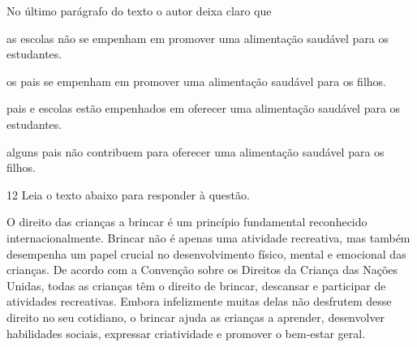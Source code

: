 No último parágrafo do texto o autor deixa claro que

\begin{escolha}
    
    \item as escolas não se empenham em promover uma alimentação saudável para os estudantes.
    
    \item os pais se empenham em promover uma alimentação saudável para os filhos.
    
    \item pais e escolas estão empenhados em oferecer uma alimentação saudável para os estudantes.
    
    \item alguns pais não contribuem para oferecer uma alimentação saudável para os filhos.

\end{escolha}

\num{12} Leia o texto abaixo para responder à questão. 

\begin{myquote}





O direito das crianças a brincar é um princípio fundamental reconhecido
internacionalmente. Brincar não é apenas uma atividade recreativa, mas também
desempenha um papel crucial no desenvolvimento físico, mental e emocional das
crianças. De acordo com a Convenção sobre os Direitos da Criança das Nações
Unidas, todas as crianças têm o direito de brincar, descansar e participar de
atividades recreativas. Embora infelizmente muitas delas não desfrutem desse
direito no seu cotidiano, o brincar ajuda as crianças a aprender, desenvolver
habilidades sociais, expressar criatividade e promover o bem-estar geral.


\end{myquote}

